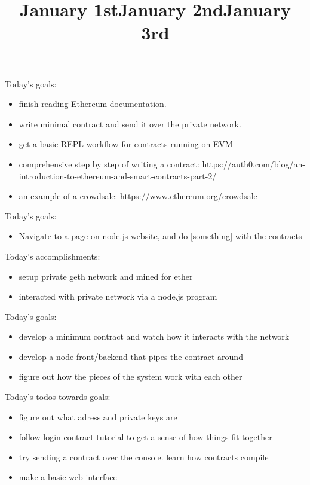 \title{January 1st}

Today's goals: 

\begin{itemize}
	\item finish reading Ethereum documentation.
	\item write minimal contract and send it over the private network.
	\item get a basic REPL workflow for contracts running on EVM 
\end{itemize}


\begin{itemize}
	\item comprehensive step by step of writing a contract: https://auth0.com/blog/an-introduction-to-ethereum-and-smart-contracts-part-2/
	\item an example of a crowdsale: https://www.ethereum.org/crowdsale
\end{itemize}


\title{January 2nd}

Today's goals:

\begin{itemize}
	\item Navigate to a page on node.js website, and do [something] with the contracts
\end{itemize}

Today's accomplishments:

\begin{itemize}
	\item setup private geth network and mined for ether
	\item interacted with private network via a node.js program
\end{itemize}


\title{January 3rd}

Today's goals:

\begin{itemize}
	\item develop a minimum contract and watch how it interacts with the network
	\item develop a node front/backend that pipes the contract around
	\item figure out how the pieces of the system work with each other
\end{itemize}


Today's todos towards goals:

\begin{itemize}
	\item figure out what adress and private keys are 
	\item follow login contract tutorial to get a sense of how things fit together
	\item try sending a contract over the console. learn how contracts compile
	\item make a basic web interface
\end{itemize}

